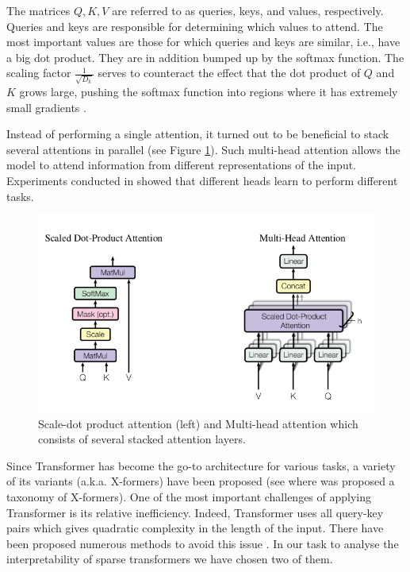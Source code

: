 \documentclass[magisterska,en]{pracamgr}
\begin{document}
The matrices $Q, K, V$ are referred to as queries, keys, and values, respectively. Queries and keys are responsible for determining which values to attend. The most important values are those for which queries and keys are similar, i.e., have a big dot product. They are in addition bumped up by the softmax function. The scaling factor $\frac{1}{\sqrt{D_k}}$ serves to counteract the effect that the dot product of $Q$ and $K$ grows large, pushing the softmax function into regions where it has extremely small gradients \cite{DBLP:conf/nips/VaswaniSPUJGKP17}.

Instead of performing a single attention, it turned out to be beneficial to stack several attentions in parallel (see Figure \ref{multi-head}). Such multi-head attention allows the model to attend information from different representations of the input. Experiments conducted in \cite{DBLP:conf/nips/VaswaniSPUJGKP17} showed that different heads learn to perform different tasks.

\begin{figure}[H]
\centering
\includegraphics[scale=0.7]{images/attention_module.png}
\caption{Scale-dot product attention (left) and Multi-head attention which consists of several stacked attention layers.}
\label{multi-head}
\end{figure}



Since Transformer has become the go-to architecture for various tasks, a variety of its variants (a.k.a. X-formers) have been proposed (see \cite{DBLP:journals/corr/abs-2106-04554} where was proposed a taxonomy of X-formers). One of the most important challenges of applying Transformer is its relative inefficiency. Indeed, Transformer uses all query-key pairs which gives quadratic complexity in the length of the input. There have been proposed numerous methods to avoid this issue \cite{DBLP:journals/csur/TayDBM23}. In our task to analyse the interpretability of sparse transformers we have chosen two of them.
\end{document}
